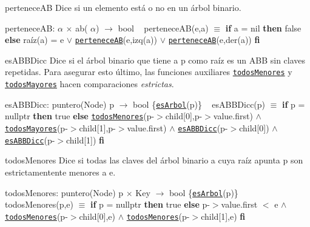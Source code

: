 \begin{DoxyParagraph}{pertenece\+AB}
Dice si un elemento está o no en un árbol binario.

pertenece\+AB\+:  $\alpha$ $\times$ ab( $\alpha$) $\to$ bool ~\newline
pertenece\+A\+B(e,a) $\equiv$ {\bfseries if} a = nil {\bfseries then} false {\bfseries else} raíz(a) = e $\lor$ \href{axiomas.html#perteneceAB}{\tt pertenece\+AB}(e,izq(a)) $\lor$ \href{axiomas.html#perteneceAB}{\tt pertenece\+AB}(e,der(a)) {\bfseries fi} 


\end{DoxyParagraph}
\begin{DoxyParagraph}{es\+A\+B\+B\+Dicc}
Dice si el árbol binario que tiene a p como raíz es un A\+BB sin claves repetidas. Para asegurar esto último, las funciones auxiliares \href{axiomas.html#todosMenores}{\tt todos\+Menores} y \href{axiomas.html#todosMayores}{\tt todos\+Mayores} hacen comparaciones {\itshape estrictas}.

es\+A\+B\+B\+Dicc\+: puntero(\+Node) p $\to$ bool \{\href{axiomas.html#esArbol}{\tt es\+Arbol}(p)\} ~\newline
es\+A\+B\+B\+Dicc(p) $\equiv$ {\bfseries if} p = nullptr {\bfseries then} true {\bfseries else} \href{axiomas.html#todosMenores}{\tt todos\+Menores}(p-\/$>$child\mbox{[}0\mbox{]},p-\/$>$value.\+first) $\land$ \href{axiomas.html#todosMayores}{\tt todos\+Mayores}(p-\/$>$child\mbox{[}1\mbox{]},p-\/$>$value.\+first) $\land$ \href{axiomas.html#esABBDicc}{\tt es\+A\+B\+B\+Dicc}(p-\/$>$child\mbox{[}0\mbox{]}) $\land$ \href{axiomas.html#esABBDicc}{\tt es\+A\+B\+B\+Dicc}(p-\/$>$child\mbox{[}1\mbox{]}) {\bfseries fi} 


\end{DoxyParagraph}
\begin{DoxyParagraph}{todos\+Menores}
Dice si todas las claves del árbol binario a cuya raíz apunta p son estrictamentente menores a e.

todos\+Menores\+: puntero(\+Node) p $\times$ Key $\to$ bool \{\href{axiomas.html#esArbol}{\tt es\+Arbol}(p)\} ~\newline
todos\+Menores(p,e) $\equiv$ {\bfseries if} p = nullptr {\bfseries then} true {\bfseries else} p-\/$>$value.\+first $<$ e $\land$ \href{axiomas.html#todosMenores}{\tt todos\+Menores}(p-\/$>$child\mbox{[}0\mbox{]},e) $\land$ \href{axiomas.html#todosMenores}{\tt todos\+Menores}(p-\/$>$child\mbox{[}1\mbox{]},e) {\bfseries fi} 


\end{DoxyParagraph}
